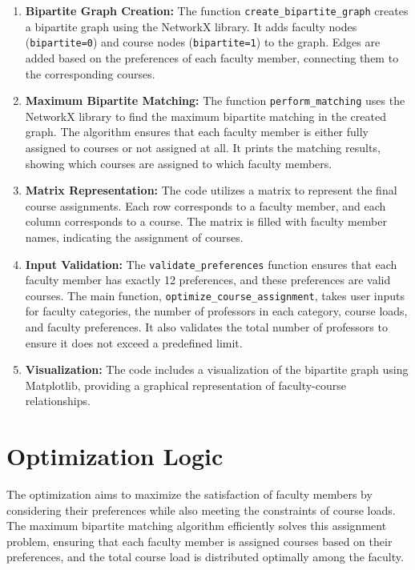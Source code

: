 \documentclass[twoside]{article}
\begin{document}
\begin{enumerate}[label= \arabic*.]
    \item \textbf{Bipartite Graph Creation:} The function \texttt{create\_bipartite\_graph} creates a bipartite graph using the NetworkX library. It adds faculty nodes (\texttt{bipartite=0}) and course nodes (\texttt{bipartite=1}) to the graph. Edges are added based on the preferences of each faculty member, connecting them to the corresponding courses.
    \item \textbf{Maximum Bipartite Matching:} The function \texttt{perform\_matching} uses the NetworkX library to find the maximum bipartite matching in the created graph. The algorithm ensures that each faculty member is either fully assigned to courses or not assigned at all. It prints the matching results, showing which courses are assigned to which faculty members.
    \item \textbf{Matrix Representation:} The code utilizes a matrix to represent the final course assignments. Each row corresponds to a faculty member, and each column corresponds to a course. The matrix is filled with faculty member names, indicating the assignment of courses.
    \item \textbf{Input Validation:} The \texttt{validate\_preferences} function ensures that each faculty member has exactly 12 preferences, and these preferences are valid courses. The main function, \texttt{optimize\_course\_assignment}, takes user inputs for faculty categories, the number of professors in each category, course loads, and faculty preferences. It also validates the total number of professors to ensure it does not exceed a predefined limit.
    \item \textbf{Visualization:} The code includes a visualization of the bipartite graph using Matplotlib, providing a graphical representation of faculty-course relationships.
\end{enumerate}

\section*{Optimization Logic}

The optimization aims to maximize the satisfaction of faculty members by considering their preferences while also meeting the constraints of course loads. The maximum bipartite matching algorithm efficiently solves this assignment problem, ensuring that each faculty member is assigned courses based on their preferences, and the total course load is distributed optimally among the faculty.
\end{document}
